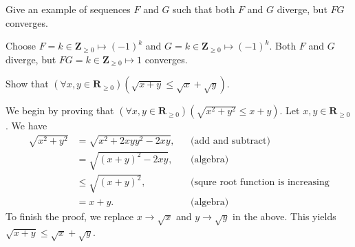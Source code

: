 \documentclass[12pt, fleqn, answers]{exam}
\newcommand{\reals}{\mathbf{R}}
\newcommand{\integers}{\mathbf{Z}}
\begin{document}
\begin{questions}
  \question Give an example of sequences $F$ and $G$ such that both $F$ and $G$ diverge, but $F G$ converges.
 \begin{solution} Choose $F = k \in \integers_{\geq 0} \mapsto (-1)^k$ and $G = k \in \integers_{\geq 0} \mapsto (-1)^k$.
 Both $F$ and $G$ diverge, but $F G =  k \in \integers_{\geq 0} \mapsto 1$ converges.
 \end{solution}
\question Show that $\left(\forall x,y \in \reals_{\geq 0}\right)(\sqrt{x+y} \leq \sqrt{x} +\sqrt{y})$.

\begin{solution} We begin by proving that $\left(\forall x,y \in \reals_{\geq 0}\right)(\sqrt{x^2 + y^2} \leq x + y) $.
Let $x,y \in \reals_{\geq 0}$. We have
\begin{align*}
\sqrt{x^2 + y^2} &= \sqrt{x^2 + 2 x y  y^2 - 2 x y}, &&\mbox{(add and subtract)} \\
                           &= \sqrt{(x + y)^2 - 2 x y}, &&\mbox{(algebra)} \\
                           &\leq \sqrt{(x + y)^2}, &&\mbox{(squre root function is increasing} \\
                           &= x + y.  &&\mbox{(algebra)} 
\end{align*}
To finish the proof, we replace $x \to \sqrt{x}$ and  $y \to \sqrt{y}$ in the above. This yields
$\sqrt{x+y} \leq \sqrt{x} + \sqrt{y}$.

\end{solution}
\end{questions}
\end{document}
